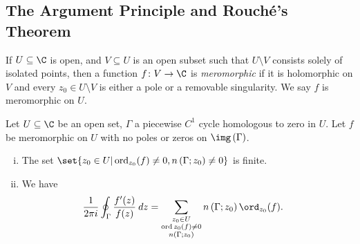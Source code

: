 \documentclass[10pt]{mypackage}
\begin{document}
\subsection{The Argument Principle and Rouché's Theorem}%
\begin{definition}
  If $U\subseteq \C$ is open, and $V\subseteq U$ is an open subset such that $U\setminus V$ consists solely of isolated points, then a function $f\colon V\rightarrow \C$ is \textit{meromorphic} if it is holomorphic on $V$ and every $z_0\in U\setminus V$ is either a pole or a removable singularity. We say $f$ is meromorphic on $U$.
\end{definition}
\begin{theorem}
  Let $U\subseteq \C$ be an open set, $\Gamma$ a piecewise $C^{1}$ cycle homologous to zero in $U$. Let $f$ be meromorphic on $U$ with no poles or zeros on $\img\left( \Gamma \right)$.
  \begin{enumerate}[(i)]
    \item The set $\set{z_0 \in U | \operatorname{ord}_{z_0}(f)\neq 0,n\left( \Gamma;z_0 \right) \neq 0}$ is finite.
    \item We have
      \begin{align*}
        \frac{1}{2\pi i} \oint_{\Gamma}^{} \frac{f'(z)}{f(z)}\:dz &= \sum_{\substack{z_0\in U \\ \operatorname{ord}{z_0}(f)\neq 0\\n\left( \Gamma;z_0 \right)}} n\left( \Gamma;z_0 \right)\ord_{z_0}(f).
      \end{align*}
  \end{enumerate}
\end{theorem}
\end{document}
